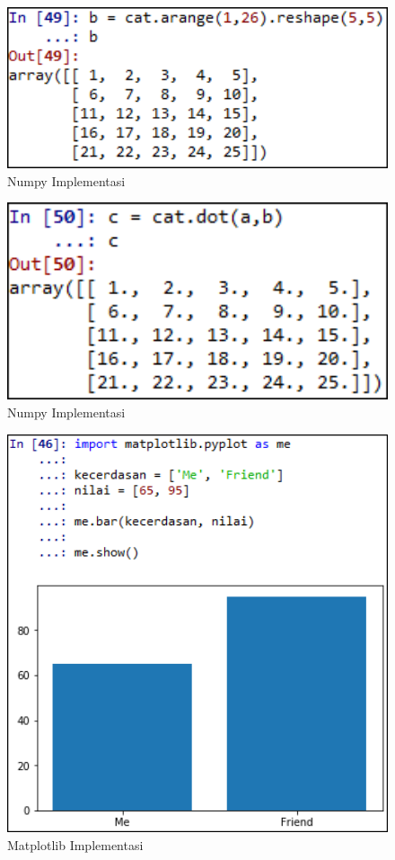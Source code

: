 \begin{figure}
	\centerline{\includegraphics[width=1\textwidth]{figures/fathi/chapter3/hari2/22.png}}
	\caption{Numpy Implementasi}
	\label{numpy2}
\end{figure}

\begin{figure}
	\centerline{\includegraphics[width=1\textwidth]{figures/fathi/chapter3/hari2/23.png}}
	\caption{Numpy Implementasi}
	\label{numpy3}
\end{figure}

\begin{figure}
	\centerline{\includegraphics[width=1\textwidth]{figures/fathi/chapter3/hari2/3.png}}
	\caption{Matplotlib Implementasi}
	\label{matplotlib}
\end{figure}

